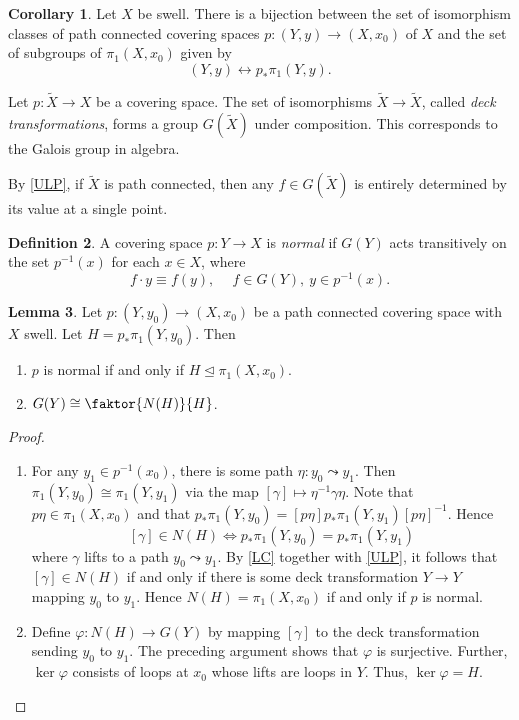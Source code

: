 \documentclass[10pt,letterpaper,cm]{nupset}
\theoremstyle{definition}
\newtheorem{definition}{Definition}[subsection]
\theoremstyle{theorem}
\newtheorem{lemma}[definition]{Lemma}
\newtheorem{corollary}[definition]{Corollary}
\theoremstyle{remark}
\newcommand{\1}{\mathbb{1}}
\newcommand{\0}{\vec 0}
\begin{document}
\begin{corollary}
Let $X$ be swell. There is a bijection between the set of isomorphism classes of path connected covering spaces $p: (Y, y) \to \left(X, x_0\right)$ of $X$ and the set of subgroups of $\pi_1\left(X, x_0\right)$ given by $$\left(Y, y\right) \longleftrightarrow p_{\ast}\pi_1(Y, y)    .$$
\end{corollary}

\smallskip

Let $p: \widetilde{X} \to X$ be a covering space. The set of isomorphisms $\widetilde{X}  \to \widetilde{X} $, called \textit{deck transformations}, forms a group $G\left(\widetilde{X}\right)$ under composition. This corresponds to the Galois group in algebra.

By \cref{ULP}, if $\widetilde{X}$ is path connected, then any $f\in G\left(\widetilde{X}\right)$ is entirely determined by its value at a single point.

\begin{definition}
A covering space $p:Y \to X$ is \textit{normal} if $G(Y)$ acts transitively on the set $p^{-1}(x)$ for each $x\in X$, where 
\[
f  \cdot y \equiv f(y), \ \quad f \in G(Y), \ y \in p^{-1}(x)
.\]
\end{definition}

\begin{lemma}
Let $p: \left(Y, y_0\right) \to \left(X, x_0\right)$ be a path connected covering space with $X$ swell. Let \linebreak $H =  p_{\ast}\pi_1\left(Y, y_0\right)$. Then
\begin{enumerate}
\item $p$ is normal if and only if $H \unlhd \pi_1\left(X, x_0\right)$.
\item $G(Y) \cong \faktor{N(H)}{H}$. 
\end{enumerate}
\end{lemma}
\begin{proof} $ $
\begin{enumerate}
\item For any $y_1 \in p^{-1}(x_0)$, there is some path $\eta : y_0 \leadsto y_1$. Then $\pi_1\left(Y, y_0\right) \cong \pi_1(Y, y_1)$ via the map $\left[\gamma\right] \mapsto \eta^{-1} \gamma \eta$. Note that $p \eta \in \pi_1\left(X, x_0\right)$ and that $p_{\ast} \pi_1\left(Y, y_0\right) = [p \eta]p_{\ast} \pi_1(Y, y_1) [p\eta]^{-1}$. Hence 
\[
\left[\gamma\right] \in N(H) \iff  p_{\ast} \pi_1\left(Y, y_0\right) = p_{\ast} \pi_1(Y, y_1)
\]
 where $\gamma$ lifts to a path $y_0 \leadsto y_1$. By \cref{LC} together with \cref{ULP}, it follows that $\left[\gamma\right] \in N(H)$ if and only if there is some deck transformation $Y \to Y$ mapping $y_0$ to $y_1$. Hence $N(H) = \pi_1\left(X, x_0\right)$ if and only if $p$ is normal. 
\item Define $\varphi : N(H) \to G(Y)$ by mapping $\left[\gamma\right]$ to the deck transformation sending $y_0$ to $y_1$. The preceding argument shows that $\varphi$ is surjective. Further, $\ker{\varphi}$ consists of loops at $x_0$ whose lifts are loops in $Y$. Thus, $\ker{\varphi} = H$. 
\end{enumerate}
\end{proof}
\end{document}
